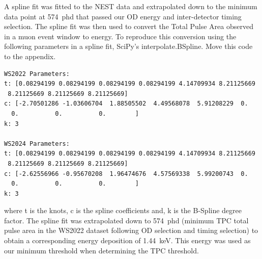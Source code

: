 A spline fit was fitted to the NEST data and extrapolated down to the minimum data point at 574~phd that passed our OD energy and inter-detector timing selection. The spline fit was then used to convert the Total Pulse Area observed in a muon event window to energy. To reproduce this conversion using the following parameters in a spline fit, SciPy's {\asciifamily interpolate.BSpline}. {\color{red}Move this code to the appendix.}
\begin{lstlisting}
WS2022 Parameters:
t: [0.08294199 0.08294199 0.08294199 0.08294199 4.14709934 8.21125669
 8.21125669 8.21125669 8.21125669]
c: [-2.70501286 -1.03606704  1.88505502  4.49568078  5.91208229  0.
  0.          0.          0.        ]
k: 3

WS2024 Parameters:
t: [0.08294199 0.08294199 0.08294199 0.08294199 4.14709934 8.21125669
 8.21125669 8.21125669 8.21125669]
c: [-2.62556966 -0.95670208  1.96474676  4.57569338  5.99200743  0.
  0.          0.          0.        ]
k: 3
\end{lstlisting}
where {\asciifamily t} is the knots, {\asciifamily c} is the spline coefficients and, {\asciifamily k} is the B-Spline degree factor.
The spline fit was extrapolated down to 574~phd (minimum TPC total pulse area in the WS2022 dataset following OD selection and timing selection) to obtain a corresponding energy deposition of 1.44~keV. This energy was used as our minimum threshold when determining the TPC threshold.


